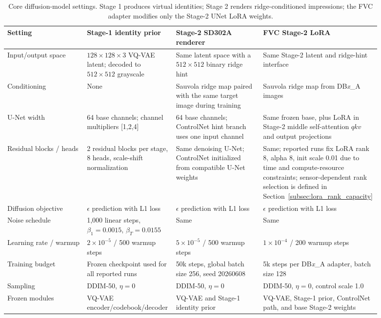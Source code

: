 \documentclass{article}
\begin{document}
\begin{table}[!htbp]
    \centering
    \small
    \caption{Core diffusion-model settings.  Stage 1 produces virtual
    identities; Stage 2 renders ridge-conditioned impressions; the FVC adapter
    modifies only the Stage-2 UNet LoRA weights.}
    \label{tab:appendix_generator_hparams}
    \setlength{\tabcolsep}{4.5pt}
    \renewcommand{\arraystretch}{1.05}
    \begin{tabular}{p{0.215\linewidth}|p{0.235\linewidth}p{0.235\linewidth}p{0.205\linewidth}}
        \toprule
        Setting & Stage-1 identity prior & Stage-2 SD302A renderer & FVC Stage-2 LoRA \\
        \midrule
        Input/output space
        & $128\times128\times3$ VQ-VAE latent; decoded to $512\times512$
        grayscale
        & Same latent space with a $512\times512$ binary ridge hint
        & Same Stage-2 latent and ridge-hint interface \\
        Conditioning
        & None
        & Sauvola ridge map paired with the same target image during training
        & Sauvola ridge map from DB\emph{x}\_A images \\
        U-Net width
        & 64 base channels; channel multipliers [1,2,4]
        & 64 base channels; ControlNet hint branch uses one input channel
        & Same frozen base, plus LoRA in Stage-2 middle self-attention
        $qkv$ and output projections \\
        Residual blocks / heads
        & 2 residual blocks per stage, 8 heads, scale-shift normalization
        & Same denoising U-Net; ControlNet initialized from compatible U-Net
        weights
        & Same; reported runs fix LoRA rank 8, alpha 8, init scale 0.01
        due to time and compute-resource constraints; sensor-dependent rank
        selection is defined in
        Section~\ref{subsec:lora_rank_capacity} \\
        Diffusion objective
        & $\epsilon$ prediction with L1 loss
        & $\epsilon$ prediction with L1 loss
        & $\epsilon$ prediction with L1 loss \\
        Noise schedule
        & 1,000 linear steps, $\beta_1=0.0015$, $\beta_T=0.0155$
        & Same
        & Same \\
        Learning rate / warmup
        & $2{\times}10^{-5}$ / 500 warmup steps
        & $5{\times}10^{-5}$ / 500 warmup steps
        & $1{\times}10^{-4}$ / 200 warmup steps \\
        Training budget
        & Frozen checkpoint used for all reported runs
        & 50k steps, global batch size 256, seed 20260608
        & 5k steps per DB\emph{x}\_A adapter, batch size 128 \\
        Sampling
        & DDIM-50, $\eta=0$
        & DDIM-50, $\eta=0$
        & DDIM-50, $\eta=0$, control scale 1.0 \\
        Frozen modules
        & VQ-VAE encoder/codebook/decoder
        & VQ-VAE and Stage-1 identity prior
        & VQ-VAE, Stage-1 prior, ControlNet path, and base Stage-2 weights \\
        \bottomrule
    \end{tabular}
\end{table}
\FloatBarrier
\end{document}
